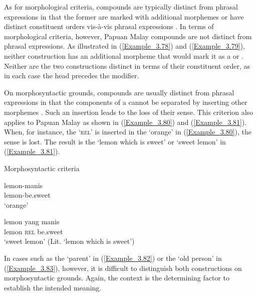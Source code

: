 As for morphological criteria, compounds are typically distinct from phrasal expressions in that the former are marked with additional morphemes or have distinct constituent orders vis-à-vis phrasal expressions {\citep[26]{Aikhenvald.2007}}. In terms of morphological criteria, however, Papuan Malay compounds are not distinct from phrasal expressions. As illustrated in (\ref{Example_3.78}) and (\ref{Example_3.79}), neither construction has an additional morpheme that would mark it as a  or . Neither are the two constructions distinct in terms of their constituent order, as in each case the head precedes the modifier.


On morphosyntactic grounds, compounds are usually distinct from phrasal expressions in that the components of a  cannot be separated by inserting other morphemes {\citep[26]{Aikhenvald.2007}}. Such an insertion leads to the loss of their  sense. This criterion also applies to Papuan Malay as shown in (\ref{Example_3.80}) and (\ref{Example_3.81}). When, for instance, the   ‘\textsc{rel}’ is inserted in the   ‘orange’ in (\ref{Example_3.80}), the  sense is lost. The result is the   ‘lemon which is sweet’ or ‘sweet lemon’ in (\ref{Example_3.81}).


 
\begin{styleExampleTitle}
{Morphosyntactic criteria}
\end{styleExampleTitle}
 
\ea
\label{Example_3.80}
\gll lemon-manis\\ %
lemon-be.sweet\\
 \glt ‘orange’\\
\z
 
\ea
\label{Example_3.81}
\gll lemon yang manis\\ %
{lemon} \textsc{rel} {be.sweet}\\
 \glt  ‘sweet lemon’ (Lit. ‘lemon which is sweet’)\\
\z



In cases such as the   ‘parent’ in (\ref{Example_3.82}) or the   ‘old person’ in (\ref{Example_3.83}), however, it is difficult to distinguish both constructions on morphosyntactic grounds. Again, the context is the determining factor to establish the intended meaning.



